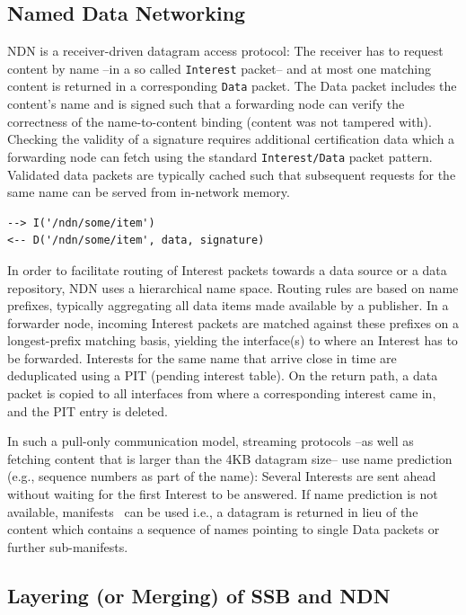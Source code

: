 \documentclass[10pt,sigconf,rewiew]{acmart}
\begin{document}
\subsection{Named Data Networking}

NDN is a receiver-driven datagram access protocol: The receiver has to
request content by name --in a so called {\tt Interest} packet-- and
at most one matching content is returned in a corresponding {\tt Data}
packet. The Data packet includes the content's name and is signed such
that a forwarding node can verify the correctness of the
name-to-content binding (content was not tampered with). Checking the validity of a signature requires
additional certification data which a forwarding node can fetch using
the standard {\tt Interest/Data} packet pattern. Validated data
packets are typically cached such that subsequent requests for the
same name can be served from in-network memory.

\begin{verbatim}
--> I('/ndn/some/item')
<-- D('/ndn/some/item', data, signature)
\end{verbatim}

In order to facilitate routing of Interest packets towards a data
source or a data repository, NDN uses a hierarchical name
space. Routing rules are based on name prefixes, typically aggregating
all data items made available by a publisher. In a forwarder node,
incoming Interest packets are matched against these prefixes on a
longest-prefix matching basis, yielding the interface(s) to where an
Interest has to be forwarded. Interests for the same name that arrive
close in time are deduplicated using a PIT (pending interest
table). On the return path, a data packet is copied to all interfaces
from where a corresponding interest came in, and the PIT entry is
deleted.

In such a pull-only communication model, streaming protocols --as well
as fetching content that is larger than the 4KB datagram size-- use
name prediction (e.g., sequence numbers as part of the name): Several
Interests are sent ahead without waiting for the first Interest to be
answered. If name prediction is not available,
manifests~\cite{DBLP:conf/infocom/BaugherDNO12} can be used i.e., a datagram is returned in
lieu of the content which contains a sequence of names pointing to
single Data packets or further sub-manifests.

\subsection{Layering (or Merging) of SSB and NDN}
\end{document}

